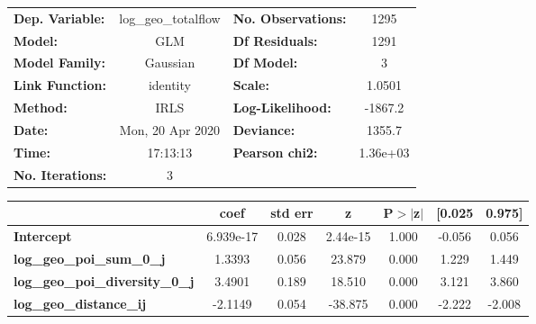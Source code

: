 \begin{center}
\begin{tabular}{lclc}
\toprule
\textbf{Dep. Variable:}                 & log\_geo\_totalflow & \textbf{  No. Observations:  } &     1295    \\
\textbf{Model:}                         &         GLM         & \textbf{  Df Residuals:      } &     1291    \\
\textbf{Model Family:}                  &       Gaussian      & \textbf{  Df Model:          } &        3    \\
\textbf{Link Function:}                 &       identity      & \textbf{  Scale:             } &    1.0501   \\
\textbf{Method:}                        &         IRLS        & \textbf{  Log-Likelihood:    } &   -1867.2   \\
\textbf{Date:}                          &   Mon, 20 Apr 2020  & \textbf{  Deviance:          } &    1355.7   \\
\textbf{Time:}                          &       17:13:13      & \textbf{  Pearson chi2:      } &  1.36e+03   \\
\textbf{No. Iterations:}                &          3          & \textbf{                     } &             \\
\bottomrule
\end{tabular}
\begin{tabular}{lcccccc}
                                        & \textbf{coef} & \textbf{std err} & \textbf{z} & \textbf{P$> |$z$|$} & \textbf{[0.025} & \textbf{0.975]}  \\
\midrule
\textbf{Intercept}                      &    6.939e-17  &        0.028     &  2.44e-15  &         1.000        &       -0.056    &        0.056     \\
\textbf{log\_geo\_poi\_sum\_0\_j}       &       1.3393  &        0.056     &    23.879  &         0.000        &        1.229    &        1.449     \\
\textbf{log\_geo\_poi\_diversity\_0\_j} &       3.4901  &        0.189     &    18.510  &         0.000        &        3.121    &        3.860     \\
\textbf{log\_geo\_distance\_ij}         &      -2.1149  &        0.054     &   -38.875  &         0.000        &       -2.222    &       -2.008     \\
\bottomrule
\end{tabular}
\end{center}